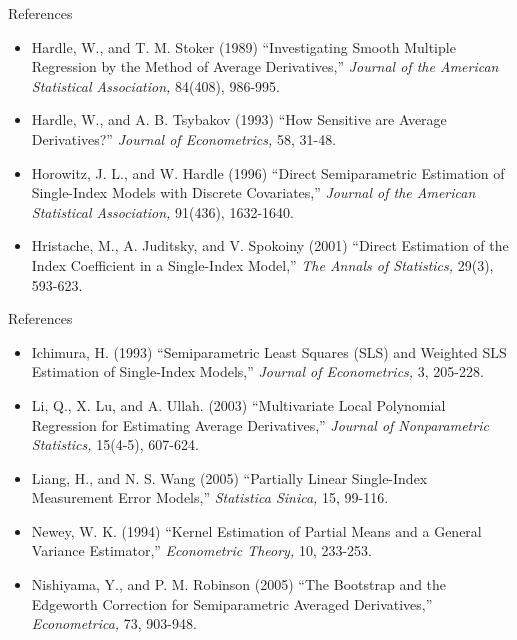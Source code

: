 \documentclass[xcolor=svgnames,dvipdfmx,cjk]{beamer}
\theoremstyle{example}
\begin{document}
\begin{frame}{References}
\begin{itemize}
  \item Hardle, W., and T. M. Stoker (1989)
        ``Investigating Smooth Multiple Regression by the Method of Average Derivatives,''
        \textit{Journal of the American Statistical Association,} 84(408), 986-995.
  \item Hardle, W., and A. B. Tsybakov (1993)
        ``How Sensitive are Average Derivatives?''
        \textit{Journal of Econometrics,} 58, 31-48.
  \item Horowitz, J. L., and W. Hardle (1996)
        ``Direct Semiparametric Estimation of Single-Index Models with Discrete Covariates,''
        \textit{Journal of the American Statistical Association,} 91(436), 1632-1640.
  \item Hristache, M., A. Juditsky, and V. Spokoiny (2001)
        ``Direct Estimation of the Index Coefficient in a Single-Index Model,''
        \textit{The Annals of Statistics,} 29(3), 593-623.
\end{itemize}
\end{frame}

\begin{frame}{References}
 \begin{itemize}
  \item Ichimura, H. (1993) 
        ``Semiparametric Least Squares (SLS) and Weighted SLS Estimation of Single-Index Models,''
        \textit{Journal of Econometrics,} 3, 205-228. 
  \item Li, Q., X. Lu, and A. Ullah. (2003)
        ``Multivariate Local Polynomial Regression for Estimating Average Derivatives,''
        \textit{Journal of Nonparametric Statistics,} 15(4-5), 607-624.
  \item Liang, H., and N. S. Wang (2005) 
        ``Partially Linear Single-Index Measurement Error Models,'' 
        \textit{Statistica Sinica,} 15, 99-116.
  \item Newey, W. K. (1994)
        ``Kernel Estimation of Partial Means and a General Variance Estimator,''
        \textit{Econometric Theory,} 10, 233-253.
  \item Nishiyama, Y., and P. M. Robinson (2005)
        ``The Bootstrap and the Edgeworth Correction for Semiparametric Averaged Derivatives,''
        \textit{Econometrica,} 73, 903-948.
 \end{itemize} 
\end{frame}
\end{document}
